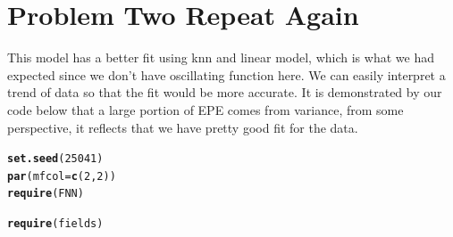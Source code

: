\documentclass{article}\usepackage[]{graphicx}\usepackage[]{color}
\makeatletter
\newcommand{\hlnum}[1]{\textcolor[rgb]{0.686,0.059,0.569}{#1}}%
\newcommand{\hlstd}[1]{\textcolor[rgb]{0.345,0.345,0.345}{#1}}%
\newcommand{\hlkwc}[1]{\textcolor[rgb]{0.333,0.667,0.333}{#1}}%
\newcommand{\hlkwd}[1]{\textcolor[rgb]{0.737,0.353,0.396}{\textbf{#1}}}%
\newenvironment{kframe}{%
 \def\at@end@of@kframe{}%
 \ifinner\ifhmode%
  \def\at@end@of@kframe{\end{minipage}}%
  \begin{minipage}{\columnwidth}%
 \fi\fi%
 \def\FrameCommand##1{\hskip\@totalleftmargin \hskip-\fboxsep
 \colorbox{shadecolor}{##1}\hskip-\fboxsep
     \hskip-\linewidth \hskip-\@totalleftmargin \hskip\columnwidth}%
 \MakeFramed {\advance\hsize-\width
   \@totalleftmargin\z@ \linewidth\hsize
   \@setminipage}}%
 {\par\unskip\endMakeFramed%
 \at@end@of@kframe}
\newenvironment{knitrout}{}{} %
\makeatother
\begin{document}
\section*{Problem Two Repeat Again}
This model has a better fit using knn and linear model, which is what we had expected since we don't have oscillating function here. We can easily interpret a trend of data so that the fit would be more accurate. It is demonstrated by our code below that a large portion of EPE comes from variance, from some perspective,  it reflects that we have pretty good fit for the data.

\begin{knitrout}
\color{fgcolor}\begin{kframe}
\begin{alltt}
\hlkwd{set.seed}\hlstd{(}\hlnum{25041}\hlstd{)}
\hlkwd{par}\hlstd{(}\hlkwc{mfcol} \hlstd{=} \hlkwd{c}\hlstd{(}\hlnum{2}\hlstd{,} \hlnum{2}\hlstd{))}
\hlkwd{require}\hlstd{(FNN)}
\end{alltt}


{\ttfamily\noindent\itshape\color{messagecolor}{\#\# Loading required package: FNN}}

{\ttfamily\noindent\color{warningcolor}{\#\# Warning: package 'FNN' was built under R version 3.0.2}}\begin{alltt}
\hlkwd{require}\hlstd{(fields)}
\end{alltt}



\end{kframe}
\end{knitrout}
\end{document}
